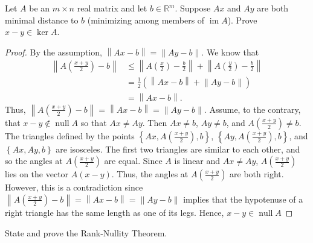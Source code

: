 \documentclass{article}
\begin{document}
\begin{problem}
Let \(A\) be an \(m\times n\) real matrix and let \(b\in \mathbb{R}^m\).
Suppose \(Ax\) and \(Ay\) are both minimal distance to \(b\) (minimizing among
members of \(\operatorname{im} A\)). Prove \(x-y\in \ker A\).
\end{problem}
\begin{proof}
	By the assumption, \(\left\lVert Ax-b \right\lVert = \left\lVert Ay-b
	\right\lVert\).  We know that
	\begin{align*}
		\left\lVert A\left(\frac{x+y}{2}\right) - b \right\lVert & \leq \left\lVert
		A\left(\frac{x}{2}\right) - \frac{b}{2}\right\lVert + \left\lVert A\left(
		\frac{y}{2}\right) - \frac{b}{2}\right\lVert                                                                                               \\
		                                                         & = \frac{1}{2} (\left\lVert Ax - b\right\lVert + \left\lVert Ay - b\right\lVert) \\
		                                                         & = \left\lVert Ax-b \right\lVert
		.\end{align*}
	Thus, \(\left\lVert A\left(\frac{x+y}{2}\right) - b \right\lVert =
	\left\lVert Ax-b \right\lVert = \left\lVert Ay-b \right\lVert\).  Assume,
	to the contrary, that \(x-y\notin \operatorname{null} A\) so that
	\(Ax\neq Ay\).  Then \(Ax \neq b\), \(Ay \neq b\), and
	\(A\left(\frac{x+y}{2}\right) \neq b\).  The triangles defined by the points
	\(\left\{Ax, A\left(\frac{x+y}{2}\right), b\right\}\), \(\left\{Ay,
	A\left(\frac{x+y}{2}\right), b\right\}\), and \(\left\{ Ax, Ay, b \right\}\)
	are isosceles.  The first two triangles are similar to each other, and so the
	angles at \(A \left( \frac{x+y}{2}\right)\) are equal.  Since \(A\) is linear
	and \(Ax \neq Ay\), \(A \left(\frac{x+y}{2}\right)\) lies on the vector
	\(A(x-y)\).  Thus, the angles at \(A \left( \frac{x+y}{2}\right)\) are both
	right.  However, this is a contradiction since \(\left\lVert
	A\left(\frac{x+y}{2}\right) - b \right\lVert = \left\lVert Ax-b
	\right\lVert = \left\lVert Ay-b \right\lVert\) implies that the hypotenuse of
	a right triangle has the same length as one of its legs.  Hence, \(x-y\in
	\operatorname{null} A\)
\end{proof}

\begin{problem}
State and prove the Rank-Nullity Theorem.
\end{problem}
\end{document}
